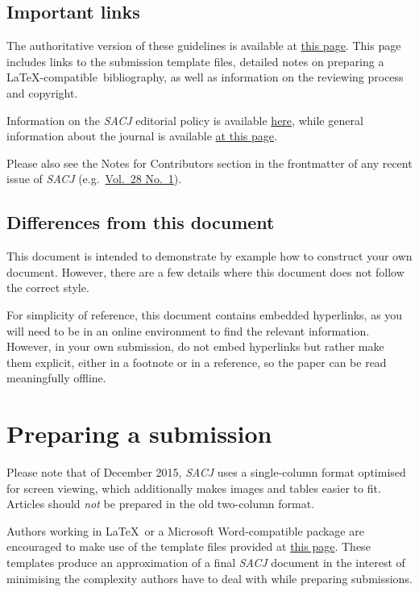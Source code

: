 \documentclass{article}
\begin{document}
\subsection{Important links}
The authoritative version of these guidelines is available at \href{http://sacj.cs.uct.ac.za/index.php/sacj/about/submissions}{this page}. This page includes links to the submission template files, detailed notes on preparing a \LaTeX-compatible~bibliography, as well as information on the reviewing process and copyright.

Information on the {\em SACJ} editorial policy is available \href{http://sacj.cs.uct.ac.za/index.php/sacj/about/editorialPolicies}{here}, while general information about the journal is available \href{http://sacj.cs.uct.ac.za/index.php/sacj/about}{at this page}. 

Please also see the Notes for Contributors section in the frontmatter of any recent issue of {\em SACJ} (e.g.~\href{http://sacj.cs.uct.ac.za/index.php/sacj/article/view/403/184}{Vol.~28 No.~1}).

\subsection{Differences from this document}
This document is intended to demonstrate by example how to construct your own document. However, there are a few details where this document does not follow the correct style.

For simplicity of reference, this document contains embedded hyperlinks, as you will need to be in an online environment to find the relevant information. However, in your own submission, do not embed hyperlinks but rather make them explicit, either in a footnote or in a reference, so the paper can be read meaningfully offline.

\section{Preparing a submission}
Please note that of December 2015, {\em SACJ} uses a single-column format optimised for screen viewing, which additionally makes images and tables easier to fit. Articles should \emph{not} be prepared in the old two-column format. 

Authors working in \LaTeX~or a Microsoft Word-compatible package are encouraged to make use of the template files provided at \href{http://sacj.cs.uct.ac.za/index.php/sacj/about/submissions#authorGuidelines}{this page}. These templates produce an approximation of a final {\em SACJ} document in the interest of minimising the complexity authors have to deal with while preparing submissions. 
\end{document}
